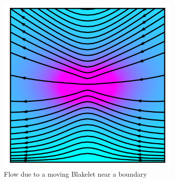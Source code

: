 \begin{figure}
    \begin{subfigure}[t]{0.45\linewidth}
        \centering%
        \includegraphics[width=\textwidth]{images_other/stokes_flow_bottomleft.png}%
        \caption{Flow due to a moving Blakelet near a boundary}%
        \label{fig:flow_sphere_blake_bc}%
    \end{subfigure}%
    \hspace{-20000sp}%
    \begin{subfigure}[t]{0.45\linewidth}%
        \centering%

\end{subfigure}
\end{figure}
